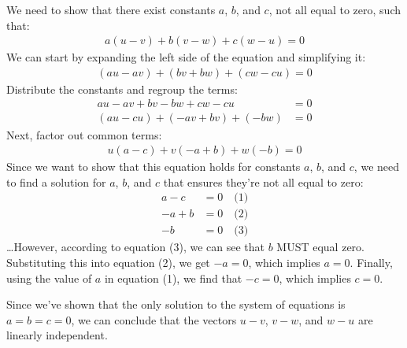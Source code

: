 \documentclass[
  letterpaper,
  DIV=11,
  numbers=noendperiod]{scrartcl}
\begin{document}
We need to show that there exist constants \(a\), \(b\), and \(c\), not
all equal to zero, such that: \begin{align*}
a(u-v)+b(v-w)+c(w-u)=0
\end{align*} We can start by expanding the left side of the equation and
simplifying it: \begin{align*}
(au-av)+(bv+bw)+(cw-cu)=0
\end{align*} Distribute the constants and regroup the terms:
\begin{align*}
au - av + bv - bw + cw - cu &= 0 \\
(au-cu)+(-av+bv)+(-bw) &= 0 
\end{align*} Next, factor out common terms: \begin{align*}
u(a-c)+v(-a+b)+w(-b)=0
\end{align*} Since we want to show that this equation holds for
constants \(a\), \(b\), and \(c\), we need to find a solution for \(a\),
\(b\), and \(c\) that ensures they're not all equal to zero:
\begin{align*}
a - c &= 0 \quad \text{(1)} \\
-a + b &= 0 \quad \text{(2)} \\
-b &= 0 \quad \text{(3)}
\end{align*} \ldots However, according to equation (3), we can see that
\(b\) MUST equal zero. Substituting this into equation (2), we get
\(-a = 0\), which implies \(a = 0\). Finally, using the value of \(a\)
in equation (1), we find that \(-c = 0\), which implies \(c = 0\).

Since we've shown that the only solution to the system of equations is
\(a = b = c = 0\), we can conclude that the vectors \(u - v\),
\(v - w\), and \(w - u\) are linearly independent.
\end{document}
